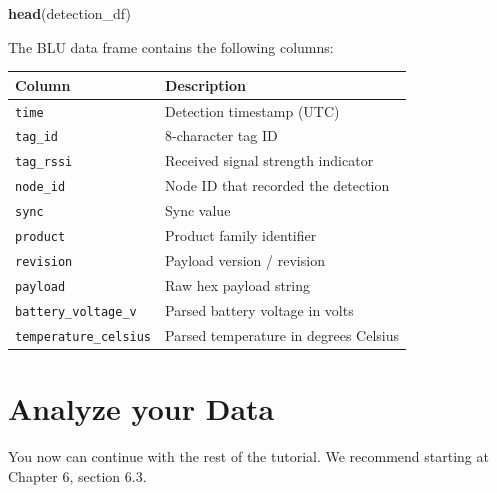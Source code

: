 \documentclass[
]{book}
\newenvironment{Shaded}{\begin{snugshade}}{\end{snugshade}}
\newcommand{\FunctionTok}[1]{\textcolor[rgb]{0.13,0.29,0.53}{\textbf{#1}}}
\newcommand{\NormalTok}[1]{#1}
\newcounter{none} %
\begin{document}
\begin{Shaded}
\begin{Highlighting}[]
\FunctionTok{head}\NormalTok{(detection\_df)}
\end{Highlighting}
\end{Shaded}

The BLU data frame contains the following columns:

{\def\LTcaptype{none} %
\begin{longtable}[]{@{}ll@{}}
\toprule\noalign{}
Column & Description \\
\midrule\noalign{}
\endhead
\bottomrule\noalign{}
\endlastfoot
\texttt{time} & Detection timestamp (UTC) \\
\texttt{tag\_id} & 8-character tag ID \\
\texttt{tag\_rssi} & Received signal strength indicator \\
\texttt{node\_id} & Node ID that recorded the detection \\
\texttt{sync} & Sync value \\
\texttt{product} & Product family identifier \\
\texttt{revision} & Payload version / revision \\
\texttt{payload} & Raw hex payload string \\
\texttt{battery\_voltage\_v} & Parsed battery voltage in volts \\
\texttt{temperature\_celsius} & Parsed temperature in degrees Celsius \\
\end{longtable}
}

\section{Analyze your Data}\label{analyze-your-data}

You now can continue with the rest of the tutorial. We recommend starting at Chapter 6, section 6.3.


\end{document}

